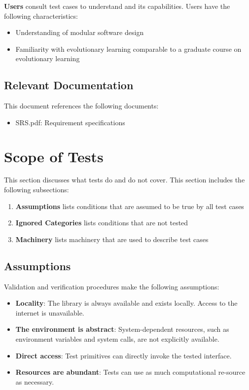 \documentclass[12pt, titlepage]{article}
\begin{document}
\textbf{Users} consult test cases to understand \thisproject and its capabilities. Users have the following characteristics:

\begin{itemize}
  \item	Understanding of modular software design
  \item	Familiarity with evolutionary learning comparable to a graduate course on evolutionary learning
\end{itemize}

\subsection{Relevant Documentation}
This document references the following documents:
\begin{itemize}
  \item	SRS.pdf: Requirement specifications 
\end{itemize}

\section{Scope of Tests}
This section discusses what tests do and do not cover. This section includes the following subsections:
\begin{enumerate}
  \item \textbf{Assumptions} lists conditions that are assumed to be true by all test cases
  \item \textbf{Ignored Categories} lists conditions that are not tested
  \item \textbf{Machinery} lists machinery that are used to describe test cases
\end{enumerate}
\subsection{Assumptions}
Validation and verification procedures make the following assumptions:
\begin{itemize}
  \item \textbf{Locality}: The library is always available and exists locally. Access to the internet is unavailable.
  \item \textbf{The environment is abstract}: System-dependent resources, such as environment variables and system calls, are not explicitly available.
  \item \textbf{Direct access}: Test primitives can directly invoke the tested interface.
  \item \textbf{Resources are abundant}: Tests can use as much computational re-source as necessary.
\end{itemize}
\end{document}
